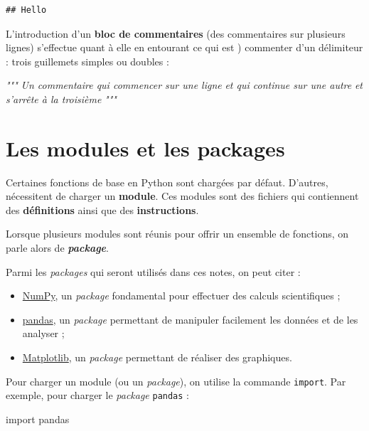 \documentclass[12pt,]{book}
\newenvironment{Shaded}{\begin{snugshade}}{\end{snugshade}}
\newcommand{\ImportTok}[1]{#1}
\newcommand{\CommentTok}[1]{\textcolor[rgb]{0.56,0.35,0.01}{\textit{#1}}}
\newcommand{\NormalTok}[1]{#1}
\providecommand{\tightlist}{%
  \setlength{\itemsep}{0pt}\setlength{\parskip}{0pt}}
\numberwithin{equation}{section}
\numberwithin{countremarque}{section}
\begin{document}
\begin{lstlisting}
## Hello
\end{lstlisting}

L'introduction d'un \textbf{bloc de commentaires} (des commentaires sur
plusieurs lignes) s'effectue quant à elle en entourant ce qui est )
commenter d'un délimiteur : trois guillemets simples ou doubles :

\begin{Shaded}
\begin{Highlighting}[]
\CommentTok{"""}
\CommentTok{Un commentaire qui commencer sur une ligne}
\CommentTok{et qui continue sur une autre}
\CommentTok{et s'arrête à la troisième}
\CommentTok{"""}
\end{Highlighting}
\end{Shaded}

\section{Les modules et les packages}\label{les-modules-et-les-packages}

Certaines fonctions de base en Python sont chargées par défaut.
D'autres, nécessitent de charger un \textbf{module}. Ces modules sont
des fichiers qui contiennent des \textbf{définitions} ainsi que des
\textbf{instructions}.

Lorsque plusieurs modules sont réunis pour offrir un ensemble de
fonctions, on parle alors de \emph{\textbf{package}}.

Parmi les \emph{packages} qui seront utilisés dans ces notes, on peut
citer :

\begin{itemize}
\tightlist
\item
  \href{http://www.numpy.org/}{NumPy}, un \emph{package} fondamental
  pour effectuer des calculs scientifiques ;
\item
  \href{https://pandas.pydata.org/}{pandas}, un \emph{package}
  permettant de manipuler facilement les données et de les analyser ;
\item
  \href{https://matplotlib.org/}{Matplotlib}, un \emph{package}
  permettant de réaliser des graphiques.
\end{itemize}

Pour charger un module (ou un \emph{package}), on utilise la commande
\texttt{import}. Par exemple, pour charger le \emph{package}
\texttt{pandas} :

\begin{Shaded}
\begin{Highlighting}[]
\ImportTok{import}\NormalTok{ pandas}
\end{Highlighting}
\end{Shaded}
\end{document}

